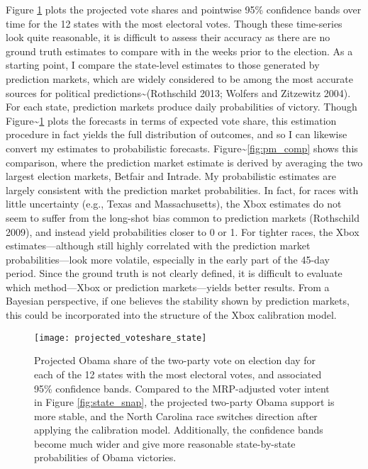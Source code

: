 Figure \ref{fig:proj_state} plots the projected vote shares and
pointwise 95\% confidence bands over time for the 12 states with the
most electoral votes. Though these time-series look quite reasonable, it
is difficult to assess their accuracy as there are no ground truth
estimates to compare with in the weeks prior to the election. As a
starting point, I compare the state-level estimates to those generated
by prediction markets, which are widely considered to be among the most
accurate sources for political predictions\textasciitilde{}(Rothschild
2013; Wolfers and Zitzewitz 2004). For each state, prediction markets
produce daily probabilities of victory. Though
Figure\textasciitilde{}\ref{fig:proj_state} plots the forecasts in terms
of expected vote share, this estimation procedure in fact yields the
full distribution of outcomes, and so I can likewise convert my
estimates to probabilistic forecasts.
Figure\textasciitilde{}\ref{fig:pm_comp} shows this comparison, where
the prediction market estimate is derived by averaging the two largest
election markets, Betfair and Intrade. My probabilistic estimates are
largely consistent with the prediction market probabilities. In fact,
for races with little uncertainty (e.g., Texas and Massachusetts), the
Xbox estimates do not seem to suffer from the long-shot bias common to
prediction markets (Rothschild 2009), and instead yield probabilities
closer to 0 or 1. For tighter races, the Xbox estimates---although still
highly correlated with the prediction market probabilities---look more
volatile, especially in the early part of the 45-day period. Since the
ground truth is not clearly defined, it is difficult to evaluate which
method---Xbox or prediction markets---yields better results. From a
Bayesian perspective, if one believes the stability shown by prediction
markets, this could be incorporated into the structure of the Xbox
calibration model.

\begin{figure}[p!]
  \centering
  \texttt{[image: projected\_voteshare\_state]}
  \caption{Projected Obama share of the two-party vote on election day
    for each of the 12 states
    with the most electoral votes, and associated 95\% confidence
    bands. Compared to the MRP-adjusted voter intent in Figure
    \ref{fig:state_snap}, the projected two-party Obama support is more stable, and the North Carolina race switches direction after applying the
    calibration model. Additionally, the confidence bands become much wider and
    give more reasonable state-by-state probabilities of Obama victories.}
  \label{fig:proj_state}
\end{figure}

